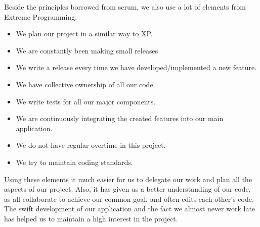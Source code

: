 Beside the principles borrowed from scrum, we also use a lot of elements from Extreme Programming:
\begin{itemize}
\item We plan our project in a similar way to XP.
\item We are constantly been making small releases 
\item We write a release every time we have developed/implemented a new feature.
\item We have collective ownership of all our code.
\item We write tests for all our major components.
\item We are continuously integrating the created features into our main application.
\item We do not have regular overtime in this project.
\item We try to maintain coding standards.
\end{itemize}
Using these elements it much easier for us to delegate our work and plan all the aspects of our project. Also, it has given us a better understanding of our code, as all collaborate to achieve our common goal, and often edits each other's code. The swift development of our application and the fact we almost never work late has helped us to maintain a high interest in the project.